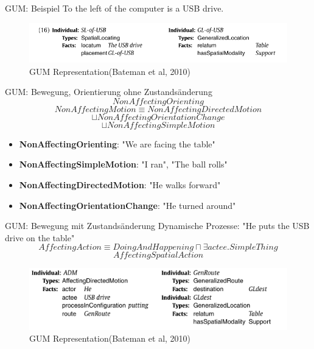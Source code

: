 \documentclass[12pt,a4paper]{beamer}
\begin{document}
\begin{frame}{GUM: Beispiel}
To the left of the computer is a USB drive.

\begin{figure}
\includegraphics[scale=0.45]{img/2010_gl_of_usb.png}
\caption{GUM Representation(Bateman et al, 2010)}
\end{figure}
\end{frame}


\begin{frame}{GUM: Bewegung, Orientierung ohne Zustandsänderung}
$$ NonAffectingOrienting  $$
$$ NonAffectingMotion \equiv NonAffectingDirectedMotion$$ 
$$\sqcup NonAffectingOrientationChange $$
$$\sqcup NonAffectingSimpleMotion$$
\begin{itemize}
\item \textbf{NonAffectingOrienting}: "We are facing the table"
\item \textbf{NonAffectingSimpleMotion}:  "I ran", "The ball rolls"
\item \textbf{NonAffectingDirectedMotion}: "He walks forward"
\item \textbf{NonAffectingOrientationChange}: "He turned around"
\end{itemize}
\end{frame}


\begin{frame}{GUM: Bewegung mit Zustandsänderung}
Dynamische Prozesse: "He puts the USB drive on the table"
$$AffectingAction \equiv DoingAndHappening \sqcap \exists actee.SimpleThing$$
$$AffectingSpatialAction$$
\begin{figure}
\includegraphics[scale=0.7]{img/2010_puts_usb_on_table.png}
\caption{GUM Representation(Bateman et al, 2010)}
\end{figure}
\end{frame}
\end{document}
